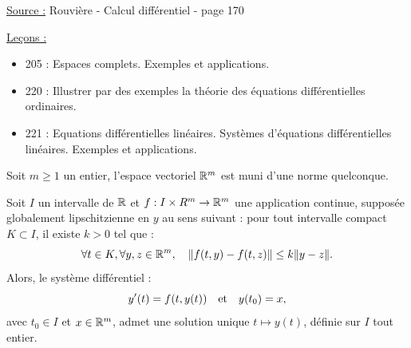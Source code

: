 

\pagestyle{fancy}

\fancyhead[C]{}
\fancyhead[R]{}



\underline{Source :} Rouvière - Calcul différentiel - page 170 \newline 

\underline{Leçons :}
\begin{itemize}

\item 205 : Espaces complets. Exemples et applications.
\item 220 : Illustrer par des exemples la théorie des équations différentielles ordinaires.
\item 221 : Equations différentielles linéaires. Systèmes d’équations différentielles linéaires. Exemples et applications.

\end{itemize}

Soit $m \geq 1$ un entier, l'espace vectoriel $\mathbb{R}^m$ est muni d'une norme quelconque.

\begin{thm}
Soit $I$ un intervalle de $\mathbb{R}$ et $f : I \times R^m \to \mathbb{R}^m$ une application continue, supposée globalement lipschitzienne en $y$ au sens suivant : pour tout intervalle compact $K \subset I$, il existe $k >0$ tel que :
\[ \forall t \in K,  \forall y, z \in \mathbb{R}^m, \quad \lVert f(t,y) - f(t,z)\rVert \leq k \lVert y-z\rVert . \]
Alors, le système différentiel :
\begin{equation} 
y'(t) = f(t,y(t)) \quad \text{et} \quad y(t_0)=x ,
\end{equation}
avec $t_0 \in I$ et $x \in \mathbb{R}^m$, admet une solution unique $t \mapsto y(t)$, définie sur $I$ tout entier.
\end{thm}

